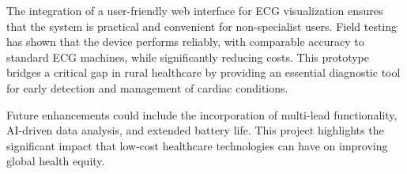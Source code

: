 \vspace{0.8cm}
The integration of a user-friendly web interface for ECG visualization ensures that the system is practical and convenient for non-specialist users. Field testing has shown that the device performs reliably, with comparable accuracy to standard ECG machines, while significantly reducing costs. This prototype bridges a critical gap in rural healthcare by providing an essential diagnostic tool for early detection and management of cardiac conditions.

\vspace{0.8cm}
Future enhancements could include the incorporation of multi-lead functionality, AI-driven data analysis, and extended battery life. This project highlights the significant impact that low-cost healthcare technologies can have on improving global health equity.

